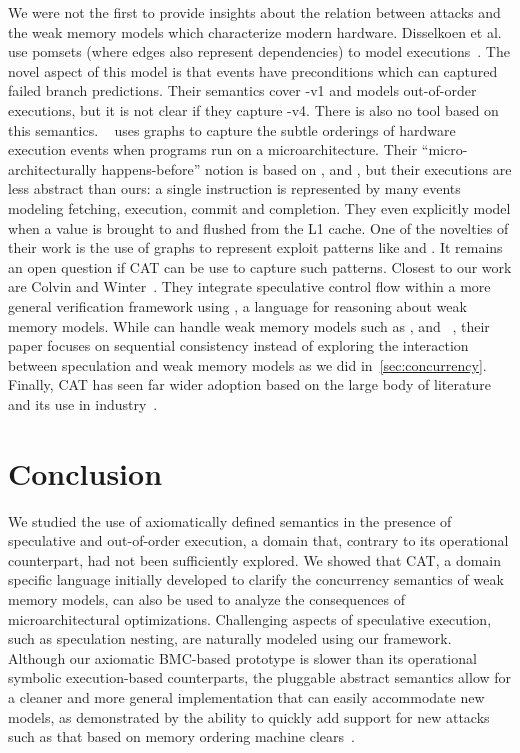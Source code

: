 \documentclass[conference]{IEEEtran}
\begin{document}
We were not the first to provide insights about the relation between \spectre attacks and the weak memory models which characterize modern hardware.
Disselkoen et al. use pomsets (where edges also represent dependencies) to model executions~\cite{DisselkoenJJR19}.
The novel aspect of this model is that events have preconditions which can captured failed branch predictions.
Their semantics cover \spectre-v1 and models out-of-order executions, but it is not clear if they capture \spectre-v4.
There is also no tool based on this semantics.
\checkmate~\cite{checkmate} uses graphs to capture the subtle orderings of hardware execution events when programs run on a microarchitecture.
Their ``micro-architecturally happens-before'' notion is based on ,  and , but their executions are less abstract than ours: a single instruction is represented by many events modeling fetching, execution, commit and completion.
They even explicitly model when a value is brought to and flushed from the L1 cache.
One of the novelties of their work is the use of graphs to represent exploit patterns like \flushreload and \primeprove.
It remains an open question if CAT can be use to capture such patterns.
Closest to our work are Colvin and Winter~\cite{ColvinW19}.
They integrate speculative control flow within a more general verification framework using \impro, a language for reasoning about weak memory models.
While \impro can handle weak memory models such as \tso, \power and \arm~\cite{ColvinS18}, their paper focuses on sequential consistency instead of exploring the interaction between speculation and weak memory models as we did in~\autoref{sec:concurrency}.
Finally, CAT has seen far wider adoption based on the large body of literature~\cite{AlglaveMMPS18, AlglaveMT14, BattyDW16, PulteFDFSS18, SarkarSNORBMA09} and its use in industry~\cite{AlglaveDGHM21}.

\section{Conclusion}
\label{sec:conclusion}

We studied the use of axiomatically defined semantics in the presence of speculative and out-of-order execution, a domain that, contrary to its operational counterpart, had not been sufficiently explored.
We showed that CAT, a domain specific language initially developed to clarify the concurrency semantics of weak memory models, can also be used to analyze the consequences of microarchitectural optimizations.
Challenging aspects of speculative execution, such as speculation nesting, are naturally modeled using our framework.
Although our axiomatic BMC-based prototype is slower than its operational symbolic execution-based counterparts, the pluggable abstract semantics allow for a cleaner and more general implementation that can easily accommodate new models, as demonstrated by the ability to quickly add support for new attacks such as that based on memory ordering machine clears~\cite{ragab_rage_2021}.
\end{document}
